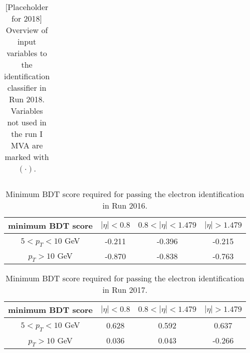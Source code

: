 \begin{table}[h!]
\begin{tabular}{c|l}
\hline %
\hline %
     \end{tabular}
\small
\caption{[Placeholder for 2018] Overview of input variables to the identification classifier in Run 2018. Variables not used in the run I MVA are marked with  $(\mathord{\cdot})$.}
    \label{tab:ele_ID_input_variables_18}
\end{table}


\begin{table}[h!]
\scriptsize
    \centering
    \begin{tabular}{c|c c c}
\hline %
minimum BDT score    &  $|\eta| < 0.8 $ & $0.8 < |\eta| < 1.479$ 	& $|\eta| > 1.479$      \\
\hline %
$ 5 < p_T < 10 $ GeV &  -0.211      & -0.396  		& -0.215		\\
$p_T > 10$ GeV       &  -0.870		& -0.838		& -0.763		\\
\hline %
\hline %
     \end{tabular}
\small
    \caption{Minimum BDT score required for passing the electron identification in Run 2016.}
    \label{tab:ele_ID_WP_16}
\end{table}

\begin{table}[h!]
\scriptsize
    \centering
    \begin{tabular}{c|c c c}
\hline %
minimum BDT score    &  $|\eta| < 0.8 $ & $0.8 < |\eta| < 1.479$ 	& $|\eta| > 1.479$      \\
\hline %
$ 5 < p_T < 10 $ GeV &  0.628      & 0.592  		& 0.637		\\
$p_T > 10$ GeV       &  0.036		& 0.043		& -0.266		\\
\hline %
\hline %
     \end{tabular}
\small
    \caption{Minimum BDT score required for passing the electron identification in Run 2017.}%
    \label{tab:ele_ID_WP}
\end{table}

